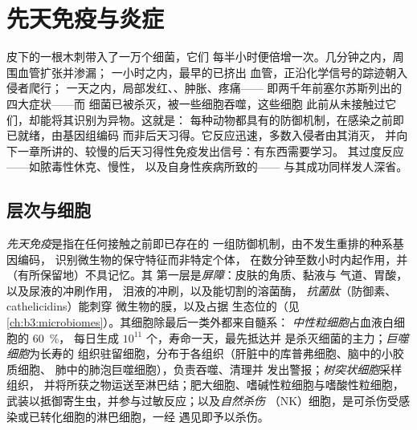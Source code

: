 \chapter{先天免疫与炎症}\label{ch:b3:innate-immunity}

皮下的一根木刺带入了一万个细菌，它们
每半小时便倍增一次。几分钟之内，周围血管扩张并渗漏；
一小时之内，最早的已挤出
血管，正沿化学信号的踪迹朝入侵者爬行；
一天之内，局部发红、、肿胀、疼痛——
即两千年前塞尔苏斯列出的四大症状——而
细菌已被杀灭，被一些细胞吞噬，这些细胞
此前从未接触过它们，却能将其识别为异物。这就是：
每种动物都具有的防御机制，在感染之前即已就绪，由基因组编码
而非后天习得。它反应迅速，多数入侵者由其消灭，
并向下一章所讲的、较慢的后天习得性免疫发出信号：有东西需要学习。
其过度反应——如脓毒性休克、慢性，
以及自身性疾病所致的——
与其成功同样发人深省。

\section{层次与细胞}

\begin{definition}[先天免疫]\label{def:b3:innate-immunity:innate}
\emph{先天免疫}是指在任何接触之前即已存在的
一组防御机制，由不发生重排的种系基因编码，
识别微生物的保守特征而非特定个体，
在数分钟至数小时内起作用，并（有所保留地）不具记忆。其
第一层是\emph{屏障}：皮肤的角质、黏液与
气道、胃酸，以及尿液的冲刷作用，
泪液的冲刷，以及能切割的溶菌酶，
\emph{抗菌肽}（防御素、cathelicidins）能刺穿
微生物的膜，以及占据
生态位的（见\cref{ch:b3:microbiomes}）。其细胞除最后一类外都来自髓系：
\emph{中性粒细胞}占血液白细胞的 \qty{60}{\%}，
每日生成 $10^{11}$ 个，寿命一天，最先抵达并
是杀灭细菌的主力；\emph{巨噬细胞}为长寿的
组织驻留细胞，分布于各组织（肝脏中的库普弗细胞、脑中的小胶质细胞、
肺中的肺泡巨噬细胞），负责吞噬、清理并
发出警报；\emph{树突状细胞}采样组织，
并将所获之物运送至淋巴结；肥大细胞、嗜碱性粒细胞与嗜酸性粒细胞，
武装以抵御寄生虫，并参与过敏反应；以及\emph{自然杀伤}
（NK）细胞，是可杀伤受感染或已转化细胞的淋巴细胞，一经
遇见即予以杀伤。
\end{definition}

